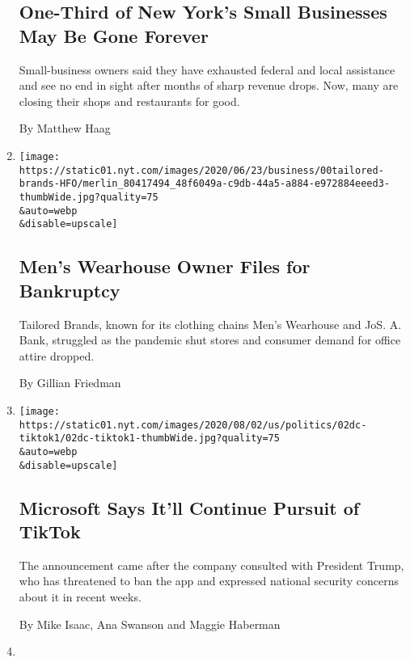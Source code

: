 \begin{enumerate}
{  \subsection{One-Third of New York's Small Businesses May Be Gone
  Forever}\label{one-third-of-new-yorks-small-businesses-may-be-gone-forever}}

  Small-business owners said they have exhausted federal and local
  assistance and see no end in sight after months of sharp revenue
  drops. Now, many are closing their shops and restaurants for good.

  By Matthew Haag
\item
  \href{/2020/08/03/business/tailored-brands-mens-wearhouse-bankruptcy.html}{}

  \texttt{[image: https://static01.nyt.com/images/2020/06/23/business/00tailored-brands-HFO/merlin\_80417494\_48f6049a-c9db-44a5-a884-e972884eeed3-thumbWide.jpg?quality=75\\\&auto=webp\\\&disable=upscale]}

  \hypertarget{mens-wearhouse-owner-files-for-bankruptcy}{%
  \subsection{Men's Wearhouse Owner Files for
  Bankruptcy}\label{mens-wearhouse-owner-files-for-bankruptcy}}

  Tailored Brands, known for its clothing chains Men's Wearhouse and
  JoS. A. Bank, struggled as the pandemic shut stores and consumer
  demand for office attire dropped.

  By Gillian Friedman
\item
  \href{/2020/08/02/business/economy/trump-tiktok-china-national-security.html}{}

  \texttt{[image: https://static01.nyt.com/images/2020/08/02/us/politics/02dc-tiktok1/02dc-tiktok1-thumbWide.jpg?quality=75\\\&auto=webp\\\&disable=upscale]}

  \hypertarget{microsoft-says-itll-continue-pursuit-of-tiktok}{%
  \subsection{Microsoft Says It'll Continue Pursuit of
  TikTok}\label{microsoft-says-itll-continue-pursuit-of-tiktok}}

  The announcement came after the company consulted with President
  Trump, who has threatened to ban the app and expressed national
  security concerns about it in recent weeks.

  By Mike Isaac, Ana Swanson and Maggie Haberman
\item
  \href{/2020/08/02/us/politics/coronavirus-jobless-aid.html}{}


\end{enumerate}
